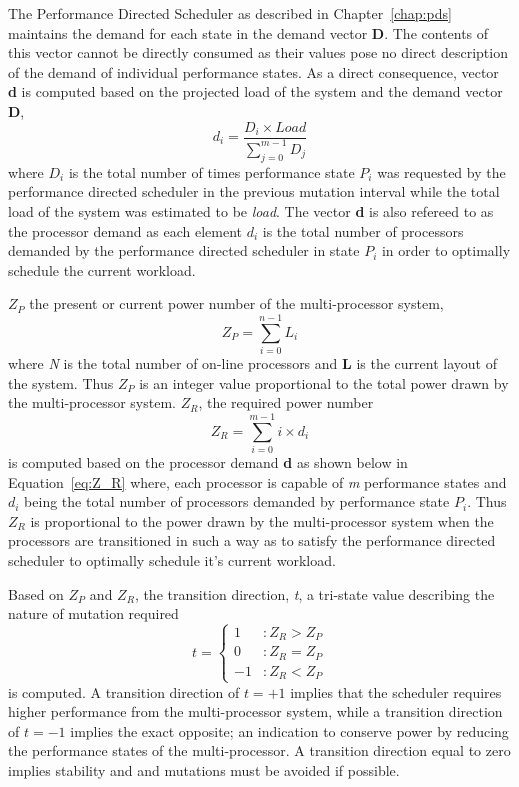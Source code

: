 The Performance Directed Scheduler as described in Chapter~\ref{chap:pds} maintains
the demand for each state in the demand vector \textbf{D}. The contents of this vector
cannot be directly consumed as their values pose no direct description of the demand 
of individual performance states. As a direct consequence, vector \textbf{d} is computed based 
on the projected load of the system and the demand vector \textbf{D},
\begin{equation}
    d_{i} = \frac{D_{i} \times Load}{\displaystyle\sum_{j=0}^{m-1} {D_{j}}}
\label{eq:processor_demand}
\end{equation}
where $D_i$ is the total number of times performance state $P_i$ was requested by the performance directed scheduler in 
the previous mutation interval while the total load of the system was estimated to be \textit{load}. The vector \textbf{d}
is also refereed to as the processor demand as each element $d_i$ is the total number of processors demanded by the 
performance directed scheduler in state $P_i$ in order to optimally schedule the current workload. 

$Z_P$ the present or current power number of the multi-processor system,
\begin{equation}
    Z_{P} = \displaystyle\sum_{i=0}^{n-1} {L_{i}} 
\label{eq:Z_P}
\end{equation}
where \textit{N} is the total number of on-line processors and \textbf{L} is the current layout of the system. Thus $Z_P$ 
is an integer value proportional to the total power drawn by the multi-processor system. $Z_R$, the required power number  
\begin{equation}
    Z_{R} = \displaystyle\sum_{i=0}^{m-1} {i \times d_{i}} 
\label{eq:Z_R}
\end{equation}
is computed based on the processor demand \textbf{d} as shown below in Equation~\eqref{eq:Z_R} where,
each processor is capable of \textit{m} performance states and $d_i$ being the total number of processors demanded
by performance state $P_i$. Thus $Z_R$ is proportional to the power drawn by the multi-processor system when the processors
are transitioned in such a way as to satisfy the performance directed scheduler to optimally schedule it's current workload. 

Based on $Z_{P}$ and $Z_{R}$, the transition direction, \textit{t}, a tri-state value describing the nature of 
mutation required
\begin{equation}
    t = \left\{
     \begin{array}{lr}
       1 & : Z_{R} > Z_{P}\\
       0 & : Z_{R} = Z_{P} \\
       -1 & : Z_{R} < Z_{P}
     \end{array}
   \right.
\label{eq:transition_dir}
\end{equation}
is computed. A transition direction of $t = +1$ implies that the scheduler requires higher performance from
the multi-processor system, while a transition direction of $t = -1$ implies the exact opposite; an indication
to conserve power by reducing the performance states of the multi-processor. A transition direction equal to zero
implies stability and and mutations must be avoided if possible. 

